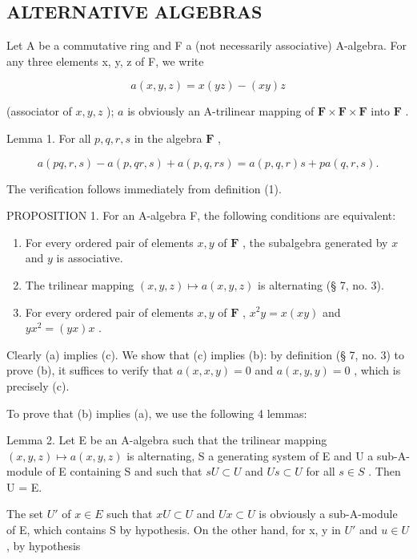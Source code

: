 \subsection{ALTERNATIVE ALGEBRAS}

Let A be a commutative ring and F a (not necessarily associative) A-algebra. For any three elements x, y, z of F, we write

\[
a (x, y, z) = x (y z) - (x y) z\tag{1}
\]

(associator of \(x, y, z\) ); \(a\) is obviously an A-trilinear mapping of \(\mathbf{F} \times \mathbf{F} \times \mathbf{F}\) into \(\mathbf{F}\) .

Lemma 1. For all \(p, q, r, s\) in the algebra \(\mathbf{F}\) ,

\[
a (p q, r, s) - a (p, q r, s) + a (p, q, r s) = a (p, q, r) s + p a (q, r, s).\tag{2}
\]

The verification follows immediately from definition (1).

PROPOSITION 1. For an A-algebra F, the following conditions are equivalent:

\begin{enumerate}
\def\labelenumi{(\alph{enumi})}
\item
  For every ordered pair of elements \(x, y\) of \(\mathbf{F}\) , the subalgebra generated by \(x\) and \(y\) is associative.
\item
  The trilinear mapping \((x, y, z) \mapsto a(x, y, z)\) is alternating (§ 7, no. 3).
\item
  For every ordered pair of elements \(x, y\) of \(\mathbf{F}\) , \(x^2y = x(xy)\) and \(yx^2 = (yx)x\) .
\end{enumerate}

Clearly (a) implies (c). We show that (c) implies (b): by definition (§ 7, no. 3) to prove (b), it suffices to verify that \(a(x, x, y) = 0\) and \(a(x, y, y) = 0\) , which is precisely (c).

To prove that (b) implies (a), we use the following 4 lemmas:

Lemma 2. Let E be an A-algebra such that the trilinear mapping \((x,y,z)\mapsto a(x,y,z)\) is alternating, S a generating system of E and U a sub-A-module of E containing S and such that \(sU\subset U\) and \(Us\subset U\) for all \(s\in S\) . Then U = E.

The set \(U'\) of \(x \in E\) such that \(xU \subset U\) and \(Ux \subset U\) is obviously a sub-A-module of E, which contains S by hypothesis. On the other hand, for x, y in \(U'\) and \(u \in U\) , by hypothesis

